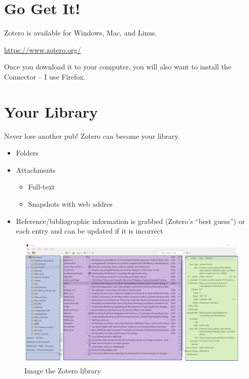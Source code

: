 \documentclass[
  english,
]{book}
\providecommand{\tightlist}{%
  \setlength{\itemsep}{0pt}\setlength{\parskip}{0pt}}
\begin{document}
\hypertarget{go-get-it}{%
\section{Go Get It!}\label{go-get-it}}

Zotero is available for Windows, Mac, and Linus.

\url{https://www.zotero.org/}

Once you download it to your computer, you will also want to install the Connector -- I use Firefox.

\hypertarget{your-library}{%
\section{Your Library}\label{your-library}}

Never lose another pub! Zotero can become your library.

\begin{itemize}
\tightlist
\item
  Folders
\item
  Attachments

  \begin{itemize}
  \tightlist
  \item
    Full-text
  \item
    Snapshots with web addres
  \end{itemize}
\item
  Reference/bibliographic information is grabbed (Zotero's ``best guess'') or each entry and can be updated if it is incorrect
\end{itemize}

\begin{figure}
\centering
\includegraphics{images/Zotero/Zotero_library.png}
\caption{Image the Zotero library}
\end{figure}
\end{document}
